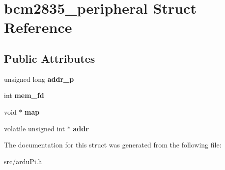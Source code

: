 \hypertarget{structbcm2835__peripheral}{}\section{bcm2835\+\_\+peripheral Struct Reference}
\label{structbcm2835__peripheral}
\subsection*{Public Attributes}
\begin{DoxyCompactItemize}
\item 
\hypertarget{structbcm2835__peripheral_a972e542acd3ccb0b9a5f73aa75251b57}{}unsigned long {\bfseries addr\+\_\+p}\label{structbcm2835__peripheral_a972e542acd3ccb0b9a5f73aa75251b57}

\item 
\hypertarget{structbcm2835__peripheral_a141406ce70084a329a865ac2e73db2f3}{}int {\bfseries mem\+\_\+fd}\label{structbcm2835__peripheral_a141406ce70084a329a865ac2e73db2f3}

\item 
\hypertarget{structbcm2835__peripheral_a8ce91c13928c404b67e1990bf4a5018b}{}void $\ast$ {\bfseries map}\label{structbcm2835__peripheral_a8ce91c13928c404b67e1990bf4a5018b}

\item 
\hypertarget{structbcm2835__peripheral_ac33828b1b9863498b33058a4ca2985dc}{}volatile unsigned int $\ast$ {\bfseries addr}\label{structbcm2835__peripheral_ac33828b1b9863498b33058a4ca2985dc}

\end{DoxyCompactItemize}


The documentation for this struct was generated from the following file\+:\begin{DoxyCompactItemize}
\item 
src/ardu\+Pi.\+h\end{DoxyCompactItemize}
